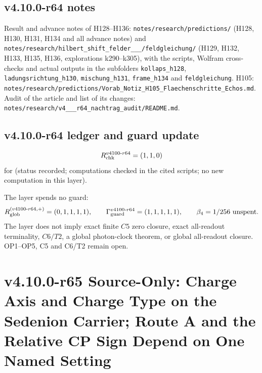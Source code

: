 \subsection*{v4.10.0-r64 notes}
\label{subsec:v4100-r64-notes}

{\raggedright
Result and advance notes of H128--H136: \texttt{notes/\allowbreak research/\allowbreak predictions/} (H128, H130, H131, H134 and all advance
notes) and \texttt{notes/\allowbreak research/\allowbreak hilbert\_\allowbreak shift\_\allowbreak felder\_\_\_/\allowbreak feldgleichung/}
(H129, H132, H133, H135, H136, explorations k290--k305), with the scripts, Wolfram cross-checks and actual outputs in the subfolders
\texttt{kollaps\_\allowbreak h128}, \texttt{ladungsrichtung\_\allowbreak h130}, \texttt{mischung\_\allowbreak h131}, \texttt{frame\_\allowbreak h134} and
\texttt{feldgleichung}.  H105: \texttt{notes/\allowbreak research/\allowbreak predictions/\allowbreak Vorab\_\allowbreak Notiz\_\allowbreak H105\_\allowbreak Flaechenschritte\_\allowbreak Echos.md}.
Audit of the article and list of its changes: \texttt{notes/\allowbreak research/\allowbreak v4\_\_\_\allowbreak r64\_\allowbreak nachtrag\_\allowbreak audit/\allowbreak README.md}.
\par}

\subsection*{v4.10.0-r64 ledger and guard update}
\label{subsec:v4100-r64-ledger-guard}

\[
R_{\rm chk}^{v4100\text{-}r64}=(1,1,0)
\]
for (status recorded; computations checked in the cited scripts; no new computation in this layer).

The layer spends no guard:
\[
R_{\rm glob}^{(v4100\text{-}r64,+)}=(0,1,1,1,1),
\qquad
\Gamma_{\rm guard}^{v4100\text{-}r64}=(1,1,1,1,1),
\qquad
\beta_4=1/256\ \text{unspent}.
\]
The layer does not imply exact finite \(C5\) zero closure, exact all-readout terminality, \(C6/T2\), a global photon-clock theorem,
or global all-readout closure.  OP1--OP5, C5 and C6/T2 remain open.

\clearpage
\section*{v4.10.0-r65 Source-Only: Charge Axis and Charge Type on the Sedenion Carrier; Route A and the Relative CP Sign Depend on One Named Setting}
\label{sec:v4100-r65-charge-axis-type}

